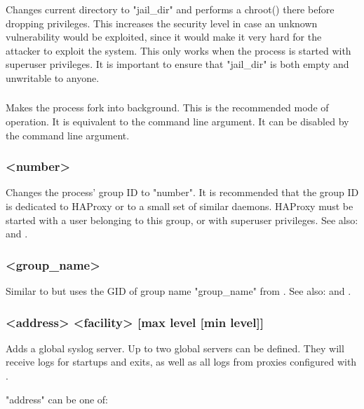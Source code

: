 Changes current directory to "jail\_dir" and performs a chroot() there before
dropping privileges. This increases the security level in case an unknown
vulnerability would be exploited, since it would make it very hard for the
attacker to exploit the system. This only works when the process is started
with superuser privileges. It is important to ensure that "jail\_dir" is both
empty and unwritable to anyone.
  
\subsubsection[daemon]{}

Makes the process fork into background. This is the recommended mode of
operation. It is equivalent to the command line  argument. It can be
disabled by the command line  argument.
  
\subsubsection[gid]{ <number>}

Changes the process' group ID to "number". It is recommended that the group
ID is dedicated to HAProxy or to a small set of similar daemons. HAProxy must
be started with a user belonging to this group, or with superuser privileges.
See also:  and .
  
\subsubsection[group]{ <group\_name>}

Similar to  but uses the GID of group name "group\_name" from .
See also:  and .

\subsubsection[log]{ <address> <facility> [max level [min level]]}

Adds a global syslog server. Up to two global servers can be defined. They
will receive logs for startups and exits, as well as all logs from proxies
configured with .

"address" can be one of:


